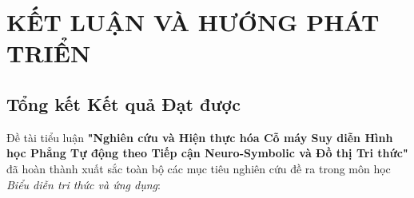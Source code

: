 
\chapter{KẾT LUẬN VÀ HƯỚNG PHÁT TRIỂN}
\label{chap:conclusion}

\section{Tổng kết Kết quả Đạt được}
Đề tài tiểu luận \textbf{"Nghiên cứu và Hiện thực hóa Cỗ máy Suy diễn Hình học Phẳng Tự động theo Tiếp cận Neuro-Symbolic và Đồ thị Tri thức"} đã hoàn thành xuất sắc toàn bộ các mục tiêu nghiên cứu đề ra trong môn học \textit{Biểu diễn tri thức và ứng dụng}:

